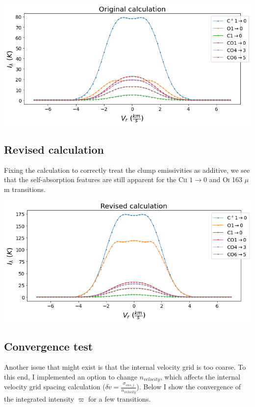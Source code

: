 \documentclass[a4paper]{article}
\begin{document}
    \includegraphics*[width=\linewidth]{voxel_single-clump_fv_new.png} \\

    \subsection{Revised calculation} \label{revised calc}
    Fixing the calculation to correctly treat the clump emissivities as additive, we see that the self-absorption features are still apparent for the C\textsc{ii} \(1 \rightarrow 0\) and O\textsc{i} 163 \(\mu\)m transitions.

    \includegraphics*[width=\linewidth]{voxel_single-clump_fv-calc_new.png} \\

    \newpage

    \subsection{Convergence test} \label{convergence}
    Another issue that might exist is that the internal velocity grid is too coarse.
    To this end, I implemented an option to change \(n_{velocity}\), which affects the internal velocity grid spacing calculation (\(\delta v = \frac{\sigma_{ens,j}}{n_{velocity}}\)).
    Below I show the convergence of the integrated intensity \(\varpi\) for a few transitions. \\
\end{document}
